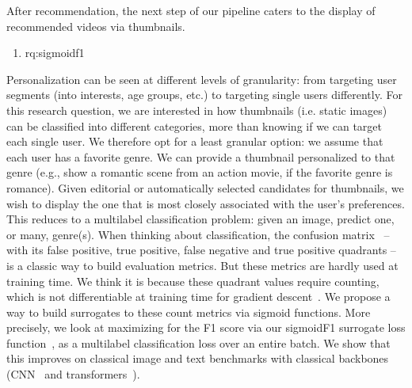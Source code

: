 After recommendation, the next step of our pipeline caters to the display of recommended videos via thumbnails.
%
%
\begin{enumerate}[label=\textbf{RQ\arabic*},ref={RQ\arabic*},resume,leftmargin=*]
	\item \acl{rq:sigmoidf1}\label{rq:sigmoidf1}
\end{enumerate}
%
Personalization can be seen at different levels of granularity: from targeting user segments (into interests, age groups, etc.) to targeting single users differently. For this research question, we are interested in how thumbnails (i.e. static images) can be classified into different categories, more than knowing if we can target each single user. We therefore opt for a least granular option: we assume that each user has a favorite genre. We can provide a thumbnail personalized to that genre (e.g., show a romantic scene from an action movie, if the favorite genre is romance). Given editorial or automatically selected candidates for thumbnails, we wish to display the one that is most closely associated with the user's preferences. This reduces to a multilabel classification problem: given an image, predict one, or many, genre(s). When thinking about classification, the confusion matrix~\cite{confusionMatrix} – with its false positive, true positive, false negative and true positive quadrants – is a classic way to build evaluation metrics. But these metrics are hardly used at training time. We think it is because these quadrant values require counting, which is not differentiable at training time for gradient descent~\cite{sgd1, sgd2}. We propose a way to build surrogates to these count metrics via sigmoid functions. More precisely, we look at maximizing for the F1 score via our sigmoidF1 surrogate loss function~\cite{sigmoidf1}, as a multilabel classification loss over an entire batch. We show that this improves on classical image and text benchmarks with classical backbones (CNN~\cite{cnn} and transformers~\cite{attention}).

